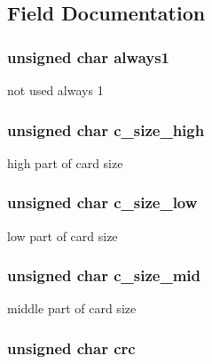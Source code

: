 \subsection{Field Documentation}
\hypertarget{struct_c_s_d_v2_af3bbe76c61e108c500f5a861dff1e6c2}{
\subsubsection[{always1}]{\setlength{\rightskip}{0pt plus 5cm}unsigned char always1}}\label{struct_c_s_d_v2_af3bbe76c61e108c500f5a861dff1e6c2}
not used always 1 \hypertarget{struct_c_s_d_v2_a8ca62fc4ed0f6598005209d3c34f9c44}{
\subsubsection[{c\-\_\-size\-\_\-high}]{\setlength{\rightskip}{0pt plus 5cm}unsigned char c\-\_\-size\-\_\-high}}\label{struct_c_s_d_v2_a8ca62fc4ed0f6598005209d3c34f9c44}
high part of card size \hypertarget{struct_c_s_d_v2_a2af914ea8fe2b045432553e2d7c75bb7}{
\subsubsection[{c\-\_\-size\-\_\-low}]{\setlength{\rightskip}{0pt plus 5cm}unsigned char c\-\_\-size\-\_\-low}}\label{struct_c_s_d_v2_a2af914ea8fe2b045432553e2d7c75bb7}
low part of card size \hypertarget{struct_c_s_d_v2_a8cd3e8cdbf34be110b1d87b0c5f7b1d8}{
\subsubsection[{c\-\_\-size\-\_\-mid}]{\setlength{\rightskip}{0pt plus 5cm}unsigned char c\-\_\-size\-\_\-mid}}\label{struct_c_s_d_v2_a8cd3e8cdbf34be110b1d87b0c5f7b1d8}
middle part of card size \hypertarget{struct_c_s_d_v2_aa7963a1d695d609cf3609747cf19fd71}{
\subsubsection[{crc}]{\setlength{\rightskip}{0pt plus 5cm}unsigned char crc}}\label{struct_c_s_d_v2_aa7963a1d695d609cf3609747cf19fd71}
